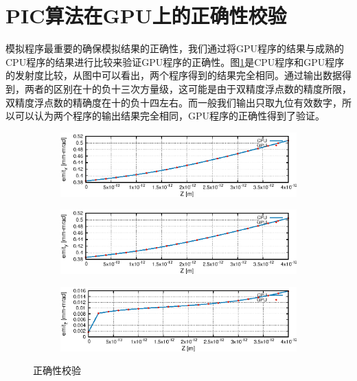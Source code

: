 \section{PIC算法在GPU上的正确性校验}
模拟程序最重要的确保模拟结果的正确性，我们通过将GPU程序的结果与成熟的CPU程序的结果进行比较来验证GPU程序的正确性。图\ref{fig:PIC_GPU_benchmark}是CPU程序和GPU程序的发射度比较，从图中可以看出，两个程序得到的结果完全相同。通过输出数据得到，两者的区别在十的负十三次方量级，这可能是由于双精度浮点数的精度所限，双精度浮点数的精确度在十的负十四左右。而一般我们输出只取九位有效数字，所以可以认为两个程序的输出结果完全相同，GPU程序的正确性得到了验证。
\begin{figure}[!htb]
    \centering
    \begin{subfigure}[b]{0.9\textwidth}
        \includegraphics[width=\textwidth]{Img/PIC_GPU_benchmark_x.eps}
    \end{subfigure}
    \begin{subfigure}[b]{0.9\textwidth}
        \includegraphics[width=\textwidth]{Img/PIC_GPU_benchmark_y.eps}
    \end{subfigure}
    \begin{subfigure}[b]{0.9\textwidth}
        \includegraphics[width=\textwidth]{Img/PIC_GPU_benchmark_z.eps}
    \end{subfigure}
    \caption{正确性校验}\label{fig:PIC_GPU_benchmark}
\end{figure}

